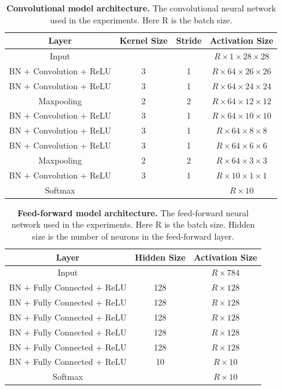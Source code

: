 \documentclass[a4paper, twoside]{article}
\begin{document}
\begin{table}[h]
\begin{center}
    \begin{tabular}{c | c | c | c}
    Layer & Kernel Size & Stride & Activation Size \\ 
    \hline \hline
    Input &  &  & $R \times 1 \times 28 \times 28$  \\ 
    BN + Convolution + ReLU & 3 & 1 & $R \times 64 \times 26 \times 26$  \\
    BN + Convolution + ReLU & 3 & 1 & $R \times 64 \times 24 \times 24$  \\ 
    Maxpooling & 2 & 2 & $R \times 64 \times 12 \times 12$  \\ 
    BN + Convolution + ReLU & 3 & 1 & $R \times 64 \times 10 \times 10$  \\ 
    BN + Convolution + ReLU & 3 & 1 & $R \times 64 \times 8 \times 8$  \\ 
    BN + Convolution + ReLU & 3 & 1 & $R \times 64 \times 6 \times 6$  \\
    Maxpooling & 2 & 2 & $R \times 64 \times 3 \times 3$  \\
    BN + Convolution + ReLU & 3 & 1 & $R \times 10 \times 1 \times 1$  \\
    Softmax &  &  & $R \times 10$  \\
    \end{tabular}\caption{\textbf{Convolutional model architecture.} The convolutional neural network used in the experiments. Here R is the batch size.}\label{tabCNN}
\end{center}
\end{table}
\begin{table}[h]
\begin{center}
    \begin{tabular}{c | c | c }
    Layer & Hidden Size & Activation Size \\ 
    \hline \hline
    Input &  &  $R  \times 784$  \\ 
    BN + Fully Connected + ReLU & 128  & $R \times 128$  \\
    BN + Fully Connected + ReLU & 128  & $R \times 128$  \\
    BN + Fully Connected + ReLU & 128  & $R \times 128$  \\
    BN + Fully Connected + ReLU & 128  & $R \times 128$  \\
    BN + Fully Connected + ReLU & 128  & $R \times 128$  \\
    BN + Fully Connected + ReLU & 10  & $R \times 10$  \\
    Softmax &  &  $R \times 10$  \\
    \end{tabular}\caption{\textbf{Feed-forward model architecture.} The feed-forward neural network used in the experiments. Here R is the batch size. Hidden size is the number of neurons in the feed-forward layer.}\label{tabFCC}
\end{center}
\end{table}
\end{document}
